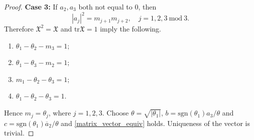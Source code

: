 \documentclass{article}
\newcommand{\tr}{\mathrm{tr}}
\newcommand{\FFX}{\mathfrak{X}}
\theoremstyle{definition}
\begin{document}
\begin{proof}
\textbf{Case 3:} If $a_2,a_3$ both not equal to $0$, then 
$$|a_j|^2=m_{j+1}m_{j+2},\quad j=1,2,3\mathrm{~mod~} 3.$$
Therefore $\FFX^2=\FFX$ and $\tr\FFX=1$ imply the following.
\begin{enumerate}

\item[(1).] $\theta_1-\theta_2-m_3=1$;
\item[(2).] $\theta_1-\theta_3-m_2=1$;
\item[(3).] $m_1-\theta_2-\theta_3=1$;
\item[(4).] $\theta_1-\theta_2-\theta_3=1$.
\end{enumerate}
Hence $m_j=\theta_j$, where $j=1,2,3$. Choose $\theta=\sqrt{|\theta_1|}$, $b=\mathrm{sgn}(\theta_1)a_3/\theta$ and $c=\mathrm{sgn}(\theta_1)\overline{a}_2/\theta$ and \eqref{matrix_vector_equiv} holds. Uniqueness of the vector is trivial.
\fi
\end{proof}
\end{document}

